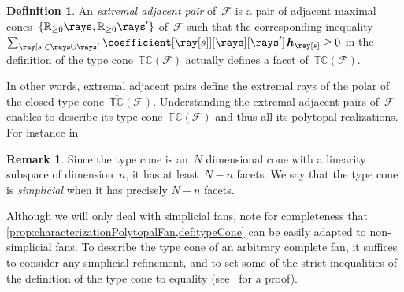 \documentclass{amsart}
\theoremstyle{definition}
\newtheorem{definition}[theorem]{Definition}
\newtheorem{remark}[theorem]{Remark}
\newcommand{\R}{\mathbb{R}} %
\renewcommand{\b}[1]{{\boldsymbol{#1}}} %
\newcommand{\darkblue}{\color{darkblue}} %
\newcommand{\defn}[1]{\textsl{\darkblue #1}} %
\newcommand{\arnau}[1]{\todo[color=orange!30]{#1 --- A.}}
\newcommand{\Fan}{\mathcal{F}} %
\newcommand{\typeCone}{\mathbb{TC}} %
\newcommand{\ctypeCone}{\overline{\mathbb{TC}}} %
\begin{document}
\begin{definition}
An \defn{extremal adjacent pair} of~$\Fan$ is a pair of adjacent maximal cones~$\{\R_{\ge0}\rays, \R_{\ge0}\rays'\}$ of~$\Fan$ such that the corresponding inequality $\sum_{\ray[s] \in \rays \cup \rays'} \coefficient[{\ray[s]}][\rays][\rays'] \, \b{h}_{\ray[s]} \geq 0$ in the definition of the type cone~$\ctypeCone(\Fan)$ actually defines a facet of~$\ctypeCone(\Fan)$.
\end{definition}

In other words, extremal adjacent pairs define the extremal rays of the polar of the closed type cone~$\ctypeCone(\Fan)$.
Understanding the extremal adjacent pairs of~$\Fan$ enables to describe its type cone~$\typeCone(\Fan)$ and thus all its polytopal realizations.
For instance in 
\arnau{unfinished sentence}

\begin{remark}
\label{rem:dimTypeCone}
Since the type cone is an~$N$ dimensional cone with a linearity subspace of dimension~$n$, it has at least~$N-n$ facets.
We say that the type cone is \defn{simplicial} when it has precisely $N-n$ facets.
\end{remark}

Although we will only deal with simplicial fans, note for completeness that \cref{prop:characterizationPolytopalFan,def:typeCone} can be easily adapted to non-simplicial fans. To describe the type cone of an arbitrary complete fan, it suffices to consider any simplicial refinement, and to set some of the strict inequalities of the definition of the type cone to equality (see~\cite[Prop.~3]{PilaudSantos-quotientopes} for a proof).
\end{document}
